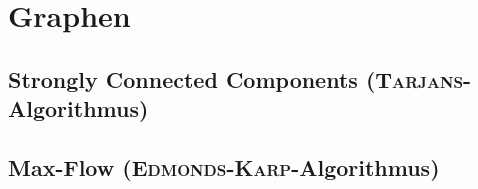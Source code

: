 \section{Graphen}

\subsection{Strongly Connected Components (\textsc{Tarjans}-Algorithmus)}


\subsection{Max-Flow (\textsc{Edmonds-Karp}-Algorithmus)}
